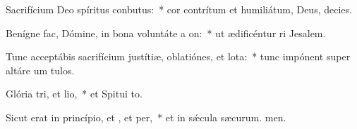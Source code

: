 \item Sacrifícium Deo spíritus conbutus:~* cor contrítum et humiliátum, Deus,  decies.
\item Benígne fac, Dómine, in bona voluntáte a on:~* ut ædificéntur ri Jesalem.
\item Tunc acceptábis sacrifícium justítiæ, oblatiónes, et lota:~* tunc impónent super altáre um tulos.
\item Glória tri, et lio,~* et Spitui to.
\item Sicut erat in princípio, et , et per,~* et in sǽcula sæcurum. men.
